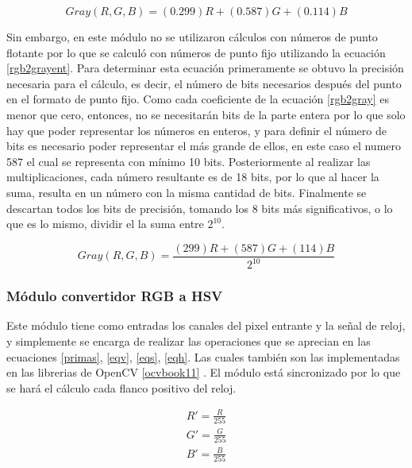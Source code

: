 \documentclass[twoside,spanish,ESP,MSc]{plantillaLabUPV}
\theoremstyle{definition}
\begin{document}
\begin{equation} \label{rgb2gray}
Gray(R,G,B) = (0.299)R + (0.587)G + (0.114)B
\end{equation}

Sin embargo, en este módulo no se utilizaron cálculos con números de punto flotante por lo que se calculó con números de punto fijo utilizando la ecuación \ref{rgb2grayent}. Para determinar esta ecuación primeramente se obtuvo la precisión necesaria para el cálculo, es decir, el número de bits necesarios después del punto en el formato de punto fijo. Como cada coeficiente de la ecuación \ref{rgb2gray} es menor que cero, entonces, no se necesitarán bits de la parte entera por lo que solo hay que poder representar los números en enteros, y para definir el número de bits es necesario poder representar el más grande de ellos, en este caso el numero 587 el cual se representa con mínimo 10 bits. Posteriormente al realizar las multiplicaciones, cada número resultante es de 18 bits, por lo que al hacer la suma, resulta en un número con la misma cantidad de bits. Finalmente se descartan todos los bits de precisión, tomando los 8 bits más significativos, o lo que es lo mismo, dividir el la suma entre $2^{10}$.

\begin{equation} \label{rgb2grayent}
Gray(R,G,B) = \frac{ (299)R + (587)G + (114)B} {2^{10}}
\end{equation}

\subsubsection{Módulo convertidor RGB a HSV}

Este módulo tiene como entradas los canales del pixel entrante y la señal de reloj, y simplemente se encarga de realizar las operaciones que se aprecian en las ecuaciones \ref{primas}, \ref{eqv}, \ref{eqs}, \ref{eqh}. Las cuales también son las implementadas en las librerias de OpenCV  \ref{ocvbook11} %
. El módulo está sincronizado por lo que se hará el cálculo cada flanco positivo del reloj.

\begin{equation} \label{primas}
\begin{aligned}
R' = \frac{R}{255}\\
G' = \frac{G}{255}\\
B' = \frac{B}{255}
\end{aligned}
\end{equation}
\end{document}
